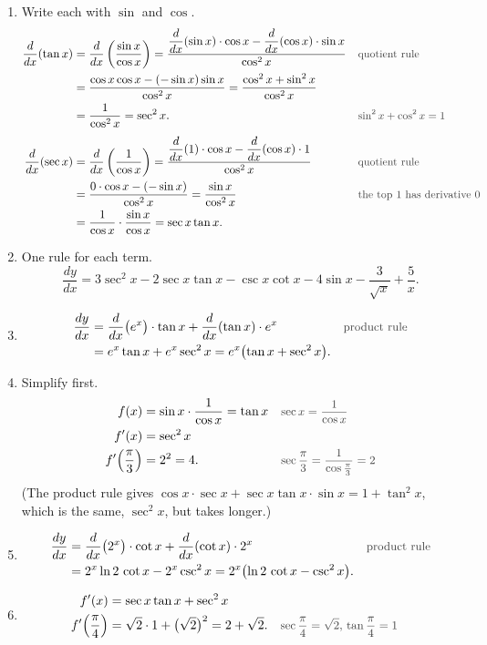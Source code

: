 \documentclass[11pt,a4paper]{article}
\newcounter{example}
\newcommand{\why}[1]{\text{\small\color{darkgray}#1}}
\begin{document}
\begin{examplesolution}
\relax
\begin{enumerate}[label=(\alph*)]
 \item Write each with $\sin$ and $\cos$.
 \begin{align*}
 \dfrac{d}{dx}(\tan x)&=\dfrac{d}{dx}\left(\frac{\sin x}{\cos x}\right)=\frac{\dfrac{d}{dx}(\sin x)\cdot\cos x-\dfrac{d}{dx}(\cos x)\cdot\sin x}{\cos^2x} &&\why{quotient rule}\\
 &=\frac{\cos x\cos x-(-\sin x)\sin x}{\cos^2x}=\frac{\cos^2x+\sin^2x}{\cos^2x}\\
 &=\frac{1}{\cos^2x}=\sec^2x. &&\why{$\sin^2x+\cos^2x=1$}\\[4pt]
 \dfrac{d}{dx}(\sec x)&=\dfrac{d}{dx}\left(\frac{1}{\cos x}\right)=\frac{\dfrac{d}{dx}(1)\cdot\cos x-\dfrac{d}{dx}(\cos x)\cdot1}{\cos^2x} &&\why{quotient rule}\\
 &=\frac{0\cdot\cos x-(-\sin x)}{\cos^2x}=\frac{\sin x}{\cos^2x} &&\why{the top $1$ has derivative $0$}\\
 &=\frac{1}{\cos x}\cdot\frac{\sin x}{\cos x}=\sec x\tan x.
 \end{align*}
 \item One rule for each term.
 \[
 \frac{dy}{dx}=3\sec^2x-2\sec x\tan x-\csc x\cot x-4\sin x-\frac{3}{\sqrt x}+\frac5x.
 \]
 \item
 \begin{align*}
 \frac{dy}{dx}&=\frac{d}{dx}\bigl(e^x\bigr)\cdot\tan x+\frac{d}{dx}(\tan x)\cdot e^x &&\why{product rule}\\
 &=e^x\tan x+e^x\sec^2x=e^x\bigl(\tan x+\sec^2x\bigr).
 \end{align*}
 \item Simplify first.
 \begin{align*}
 f(x)&=\sin x\cdot\frac{1}{\cos x}=\tan x &&\why{$\sec x=\dfrac{1}{\cos x}$}\\
 f'(x)&=\sec^2x\\
 f'\Bigl(\frac{\pi}{3}\Bigr)&=2^2=4. &&\why{$\sec\dfrac{\pi}{3}=\dfrac{1}{\cos\frac{\pi}{3}}=2$}
 \end{align*}
 (The product rule gives $\cos x\cdot\sec x+\sec x\tan x\cdot\sin x=1+\tan^2x$, which is the same, $\sec^2x$, but takes longer.)
 \item
 \begin{align*}
 \frac{dy}{dx}&=\frac{d}{dx}\bigl(2^x\bigr)\cdot\cot x+\frac{d}{dx}(\cot x)\cdot2^x &&\why{product rule}\\
 &=2^x\ln2\,\cot x-2^x\csc^2x=2^x\bigl(\ln2\,\cot x-\csc^2x\bigr).
 \end{align*}
 \item
 \begin{align*}
 f'(x)&=\sec x\tan x+\sec^2x\\
 f'\Bigl(\frac{\pi}{4}\Bigr)&=\sqrt2\cdot1+\bigl(\sqrt2\bigr)^2=2+\sqrt2. &&\why{$\sec\dfrac{\pi}{4}=\sqrt2$, $\tan\dfrac{\pi}{4}=1$}
 \end{align*}
\end{enumerate}
\end{examplesolution}
\end{document}
